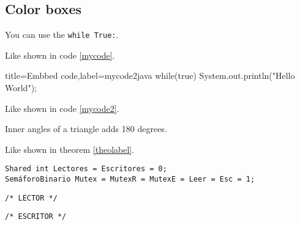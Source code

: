 \documentclass[../main.tex]{subfiles}
\begin{document}
\subsection{Color boxes}

You can use the \texttt{while True:}.

Like shown in code \ref{mycode}. \\

\begin{code}[numbers=left]{title=Embbed code,label=mycode2}{java}
while(true) {
    System.out.println("Hello World");
}
\end{code}
Like shown in code \ref{mycode2}. \\

\begin{theorem}[title=Theorem,label=theolabel]
Inner angles of a triangle adds 180 degrees. 
\end{theorem}
Like shown in theorem \ref{theolabel}.


\begin{tcolorbox}[colframe=black!13]
\begin{verbatim}
Shared int Lectores = Escritores = 0;
SemáforoBinario Mutex = MutexR = MutexE = Leer = Esc = 1;
\end{verbatim}
\end{tcolorbox}
\vspace{-11pt}
\noindent
\begin{minipage}[t]{0.47\linewidth}
\begin{tcolorbox}[colframe=black!13]
\begin{verbatim}
/* LECTOR */
\end{verbatim}
\end{tcolorbox}
\end{minipage}%
\hfill
\begin{minipage}[t]{0.47\linewidth}
\begin{tcolorbox}[colframe=black!13]
\begin{verbatim}
/* ESCRITOR */
\end{verbatim}
\end{tcolorbox}
\end{minipage}
\end{document}
